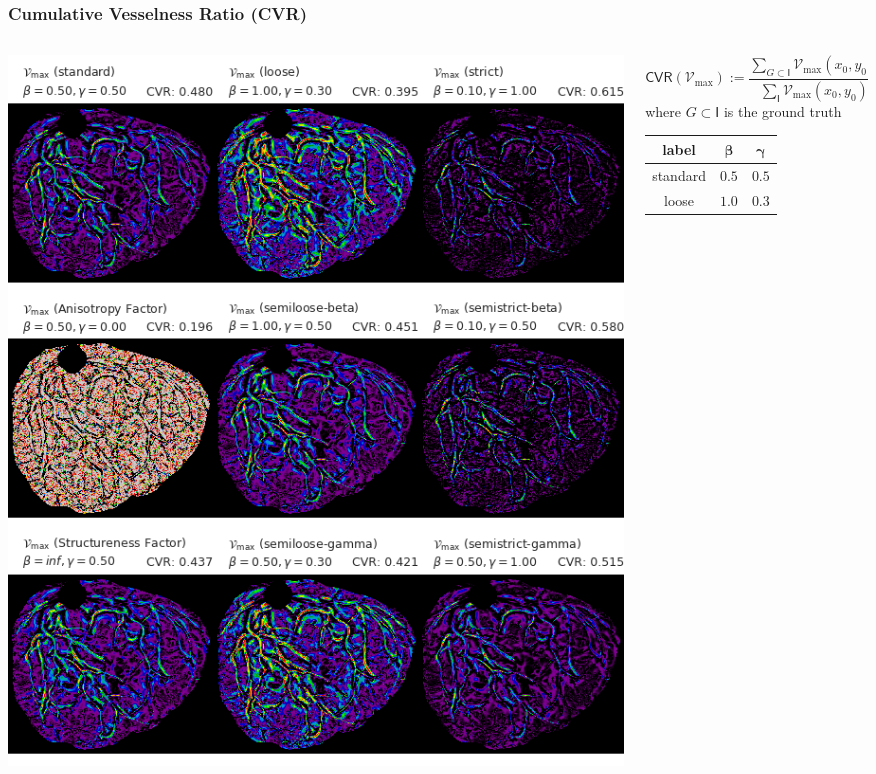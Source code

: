 \documentclass[9pt]{beamer}
\newcommand{\Vmax}{\ensuremath{\mathcal{V}_{\max}}\xspace}
\newcommand{\img}{\mathsf{I}} %
\begin{document}
\begin{frame}
\frametitle{Cumulative Vesselness Ratio (CVR)}
\begin{columns}
  \begin{column}{0.6\textwidth}
    \begin{center}
    \includegraphics[height=0.9\textheight]{BN6028328-3x3params-190322}
    \end{center}
  \end{column}
  \begin{column}{0.4\textwidth}
      \begin{equation*}
      \mathsf{CVR}\left(\Vmax\right) :=
      \frac{\sum_{G\subset\img} \Vmax(x_0, y_0)}{\sum_{\img} \Vmax(x_0,y_0)}
      \end{equation*}
      where $G \subset \img$ is the ground truth
    \begin{table}[p]\centering
      \begin{tabular}{|c|c|c|}
        \hline
        \textbf{label}  & $\bm{\beta}$ & $\bm{\gamma}$ \\ \hline
        standard & $0.5$ & $0.5$ \\ \hline
        loose & $ 1.0$ & $0.3$ \\ \hline

\end{tabular}
\end{table}
\end{column}
\end{columns}
\end{frame}
\end{document}
